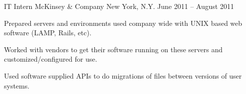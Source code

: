 \begin{cventries}
  \cventry
    {IT Intern} %
    {McKinsey \& Company} %
    {New York, N.Y.} %
    {June 2011 – August 2011} %
    {
      \begin{cvitems} %
        \item {Prepared servers and environments used company wide with UNIX based web software (LAMP, Rails, etc).}
        \item {Worked with vendors to get their software running on these servers and customized/configured for use.}
        \item {Used software supplied APIs to do migrations of files between versions of user systems.}
      \end{cvitems}
    }

\end{cventries}
